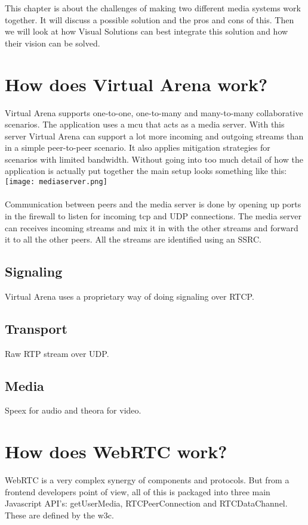 
This chapter is about the challenges of making two different media systems work together. It will discuss a possible solution and the pros and cons of this. Then we will look at how Visual Solutions can best integrate this solution and how their vision can be solved.

\section{How does Virtual Arena work?}

Virtual Arena supports one-to-one, one-to-many and many-to-many collaborative scenarios. The application uses a \gls{mcu} that acts as a media server. With this server Virtual Arena can support a lot more incoming and outgoing streams than in a simple peer-to-peer scenario. It also applies mitigation strategies for scenarios with limited bandwidth. Without going into too much detail of how the application is actually put together the main setup looks something like this: 
\\
\texttt{[image: mediaserver.png]}
\\
\\
Communication between peers and the media server is done by opening up ports in the firewall to listen for incoming tcp and UDP connections. The media server can receives incoming streams and mix it in with the other streams and forward it to all the other peers. All the streams are identified using an SSRC.

\subsection{Signaling}
Virtual Arena uses a proprietary way of doing signaling over RTCP.

\subsection{Transport}
Raw RTP stream over UDP.

\subsection{Media}
Speex for audio and theora for video.


\section{How does WebRTC work?}
WebRTC is a very complex synergy of components and protocols. But from a frontend developers point of view, all of this is packaged into three main Javascript API's: getUserMedia, RTCPeerConnection and RTCDataChannel. These are defined by the \gls{w3c}. 

